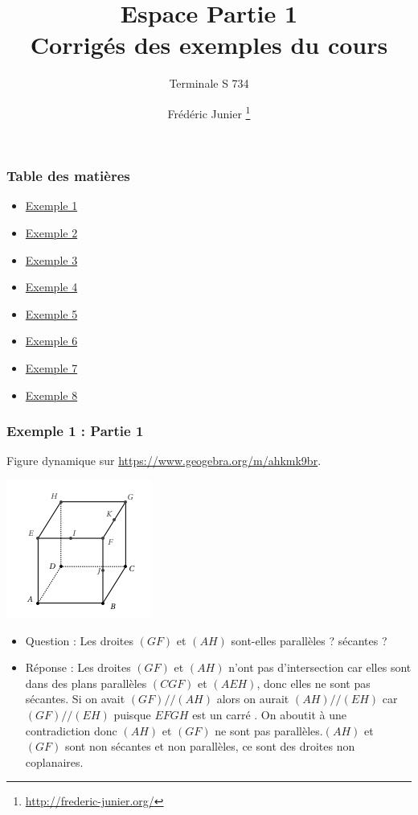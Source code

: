 \documentclass[xcolor=svgnames,t,final]{beamer}
\title{Espace Partie 1 \\ Corrigés des exemples du cours}\subtitle{Terminale S 734}
\author[]{Frédéric Junier \thanks{\url{http://frederic-junier.org/} }}
\institute[Lycée du Parc]{Lycée du Parc, Lyon}
\date[]{}
\begin{document}
\frame{\titlepage}


\begin{frame}
\frametitle{Table des matières}
\begin{itemize}
	\item \hyperlink{exemple1}{Exemple 1}
	\item \hyperlink{exemple2}{Exemple 2}
	\item \hyperlink{exemple3}{Exemple 3}
	\item \hyperlink{exemple4}{Exemple 4}
	\item \hyperlink{exemple5}{Exemple 5}
	\item \hyperlink{exemple6}{Exemple 6}
		\item \hyperlink{exemple7}{Exemple 7}
			\item \hyperlink{exemple8}{Exemple 8}
	
\end{itemize}

\end{frame}
 

 
\begin{frame}
\label{exemple1}
\frametitle{Exemple 1 : Partie 1}

Figure dynamique sur \href{https://www.geogebra.org/m/ahkmk9br}{https://www.geogebra.org/m/ahkmk9br}.


\begin{center}
\includegraphics[scale=0.5]{images/exemple1.png}
\end{center}

\begin{itemize}
\pause \item {\color{blue} Question : Les droites $(GF)$ et $(AH)$ sont-elles
   parallèles ? sécantes ? }
\pause \item {\color{red} Réponse : Les droites $(GF)$ et $(AH)$ n'ont pas d'intersection car elles sont dans des plans parallèles $(CGF)$ et $(AEH) $, donc elles ne sont pas sécantes.  Si on avait $(GF)//(AH)$ alors on aurait $(AH)//(EH)$ car $(GF)//(EH)$ puisque $EFGH$ est un carré . On aboutit à une contradiction donc $(AH)$ et $(GF)$ ne sont pas parallèles.$(AH)$ et $(GF)$ sont non sécantes et non parallèles, ce sont des droites non coplanaires.  }
\end{itemize}


\end{frame}
\end{document}
